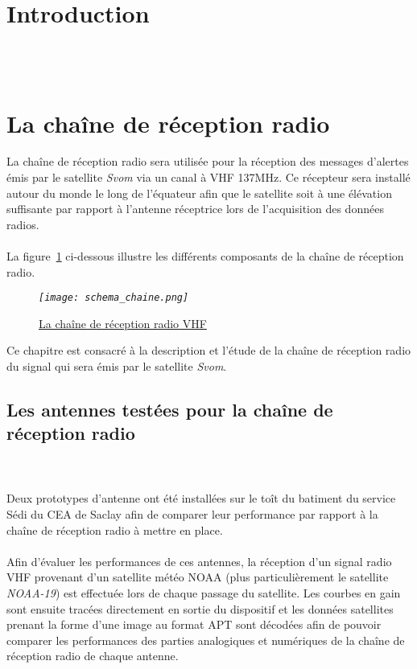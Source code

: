 \documentclass[12pt,fleqn]{book} %
\begin{document}
\pagestyle{empty} %

\tableofcontents %



\pagestyle{fancy} %
\setcounter{part}{-1}
\part{Introduction}
\setcounter{chapter}{0}
~\\\\
\part{La chaîne de réception radio}
\setcounter{chapter}{0}
La chaîne de réception radio sera utilisée pour la réception des messages d'alertes émis par le satellite \emph{Svom} via un canal à VHF 137MHz. Ce récepteur sera installé autour du monde le long de l'équateur afin que le satellite soit à une élévation suffisante par rapport à l'antenne réceptrice lors de l'acquisition des données radios.
~\\\\La figure~\ref{schema_chaine} ci-dessous illustre les différents composants de la chaîne de réception radio.
\begin{figure}[H]
	\centering
	\itshape
	\texttt{[image: schema\_chaine.png]}
	\caption{\label{schema_chaine} \underline{La chaîne de réception radio VHF}}
\end{figure}
Ce chapitre est consacré à la description et l'étude de la chaîne de réception radio du signal qui sera émis par le satellite \emph{Svom}.

\chapter{Les antennes testées pour la chaîne de réception radio} 
~\\\\Deux prototypes d'antenne ont été installées sur le toît du batiment du service Sédi du CEA de Saclay afin de comparer leur performance par rapport à la chaîne de réception radio à mettre en place.
~\\\\Afin d'évaluer les performances de ces antennes, la réception d'un signal radio VHF provenant d'un satellite météo NOAA (plus particulièrement le satellite \emph{NOAA-19}) est effectuée lors de chaque passage du satellite. Les courbes en gain sont ensuite tracées directement en sortie du dispositif et les données satellites prenant la forme d'une image au format APT sont décodées afin de pouvoir comparer les performances des parties analogiques et numériques de la chaîne de réception radio de chaque antenne.
\end{document}
